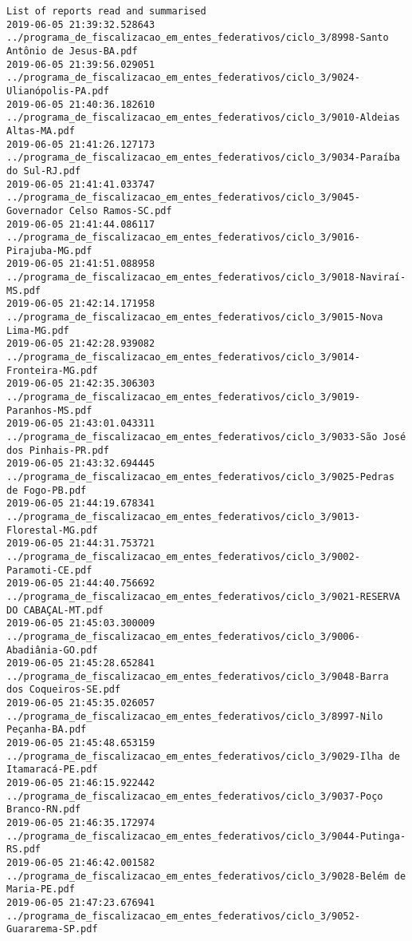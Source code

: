 \begin{lstlisting}
List of reports read and summarised
2019-06-05 21:39:32.528643 ../programa_de_fiscalizacao_em_entes_federativos/ciclo_3/8998-Santo Antônio de Jesus-BA.pdf
2019-06-05 21:39:56.029051 ../programa_de_fiscalizacao_em_entes_federativos/ciclo_3/9024-Ulianópolis-PA.pdf
2019-06-05 21:40:36.182610 ../programa_de_fiscalizacao_em_entes_federativos/ciclo_3/9010-Aldeias Altas-MA.pdf
2019-06-05 21:41:26.127173 ../programa_de_fiscalizacao_em_entes_federativos/ciclo_3/9034-Paraíba do Sul-RJ.pdf
2019-06-05 21:41:41.033747 ../programa_de_fiscalizacao_em_entes_federativos/ciclo_3/9045-Governador Celso Ramos-SC.pdf
2019-06-05 21:41:44.086117 ../programa_de_fiscalizacao_em_entes_federativos/ciclo_3/9016-Pirajuba-MG.pdf
2019-06-05 21:41:51.088958 ../programa_de_fiscalizacao_em_entes_federativos/ciclo_3/9018-Naviraí-MS.pdf
2019-06-05 21:42:14.171958 ../programa_de_fiscalizacao_em_entes_federativos/ciclo_3/9015-Nova Lima-MG.pdf
2019-06-05 21:42:28.939082 ../programa_de_fiscalizacao_em_entes_federativos/ciclo_3/9014-Fronteira-MG.pdf
2019-06-05 21:42:35.306303 ../programa_de_fiscalizacao_em_entes_federativos/ciclo_3/9019-Paranhos-MS.pdf
2019-06-05 21:43:01.043311 ../programa_de_fiscalizacao_em_entes_federativos/ciclo_3/9033-São José dos Pinhais-PR.pdf
2019-06-05 21:43:32.694445 ../programa_de_fiscalizacao_em_entes_federativos/ciclo_3/9025-Pedras de Fogo-PB.pdf
2019-06-05 21:44:19.678341 ../programa_de_fiscalizacao_em_entes_federativos/ciclo_3/9013-Florestal-MG.pdf
2019-06-05 21:44:31.753721 ../programa_de_fiscalizacao_em_entes_federativos/ciclo_3/9002-Paramoti-CE.pdf
2019-06-05 21:44:40.756692 ../programa_de_fiscalizacao_em_entes_federativos/ciclo_3/9021-RESERVA DO CABAÇAL-MT.pdf
2019-06-05 21:45:03.300009 ../programa_de_fiscalizacao_em_entes_federativos/ciclo_3/9006-Abadiânia-GO.pdf
2019-06-05 21:45:28.652841 ../programa_de_fiscalizacao_em_entes_federativos/ciclo_3/9048-Barra dos Coqueiros-SE.pdf
2019-06-05 21:45:35.026057 ../programa_de_fiscalizacao_em_entes_federativos/ciclo_3/8997-Nilo Peçanha-BA.pdf
2019-06-05 21:45:48.653159 ../programa_de_fiscalizacao_em_entes_federativos/ciclo_3/9029-Ilha de Itamaracá-PE.pdf
2019-06-05 21:46:15.922442 ../programa_de_fiscalizacao_em_entes_federativos/ciclo_3/9037-Poço Branco-RN.pdf
2019-06-05 21:46:35.172974 ../programa_de_fiscalizacao_em_entes_federativos/ciclo_3/9044-Putinga-RS.pdf
2019-06-05 21:46:42.001582 ../programa_de_fiscalizacao_em_entes_federativos/ciclo_3/9028-Belém de Maria-PE.pdf
2019-06-05 21:47:23.676941 ../programa_de_fiscalizacao_em_entes_federativos/ciclo_3/9052-Guararema-SP.pdf

\end{lstlisting}
